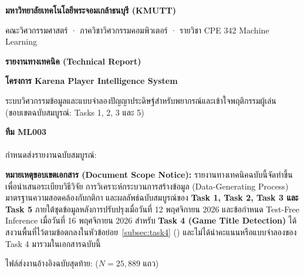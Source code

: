 \begin{titlepage}
\centering
\vspace*{1.6cm}
{\Large\bfseries มหาวิทยาลัยเทคโนโลยีพระจอมเกล้าธนบุรี (KMUTT)\par}
\vspace{0.25cm}
{\large คณะวิศวกรรมศาสตร์ · ภาควิชาวิศวกรรมคอมพิวเตอร์ · รายวิชา CPE 342 Machine Learning\par}
\vspace{1.6cm}
{\Huge\bfseries\color{NavyPrimary} รายงานทางเทคนิค (Technical Report)\par}
\vspace{0.45cm}
{\LARGE\bfseries โครงการ Karena Player Intelligence System\par}
\vspace{0.25cm}
{\large ระบบวิศวกรรมข้อมูลและแบบจำลองปัญญาประดิษฐ์สำหรับพยากรณ์และเข้าใจพฤติกรรมผู้เล่น\\
(ขอบเขตฉบับสมบูรณ์: Tasks 1, 2, 3 และ 5)\par}
\vspace{1.4cm}

\begin{tcolorbox}[colback=NavyLight,colframe=NavyPrimary,width=0.92\textwidth,arc=3pt,boxrule=0.8pt]
\centering
{\Large\bfseries ทีม ML003}\\[8pt]
\\[6pt]
กำหนดส่งรายงานฉบับสมบูรณ์: 
\end{tcolorbox}

\vspace{1.2cm}
\begin{tcolorbox}[colback=AmberLight,colframe=AmberWarn,width=0.92\textwidth,arc=2pt,boxrule=0.6pt,leftrule=3pt]
\small\raggedright
\textbf{หมายเหตุขอบเขตเอกสาร (Document Scope Notice):} รายงานทางเทคนิคฉบับนี้จัดทำขึ้นเพื่อนำเสนอระเบียบวิธีวิจัย การวิเคราะห์กระบวนการสร้างข้อมูล (Data-Generating Process) มาตรฐานความสอดคล้องกับกติกา และผลลัพธ์ฉบับสมบูรณ์ของ \textbf{Task 1, Task 2, Task 3 และ Task 5} ภายใต้ชุดข้อมูลหลังการปรับปรุงเมื่อวันที่ 12 พฤศจิกายน 2026 และข้อกำหนด Test-Free Inference เมื่อวันที่ 16 พฤศจิกายน 2026 สำหรับ \textbf{Task 4 (Game Title Detection)} ได้สงวนพื้นที่ไว้ตามข้อตกลงในหัวข้อย่อย~\ref{subsec:task4} (\textit{\TFourStatus}) และไม่ได้นำคะแนนหรือแบบจำลองของ Task 4 มารวมในเอกสารฉบับนี้
\end{tcolorbox}

\vfill
{\small ไฟล์ส่งงานอ้างอิงฉบับสุดท้าย:  ($N = 25{,}889$ แถว)\par}
\end{titlepage}

